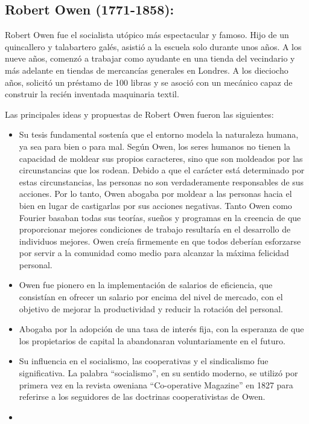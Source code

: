 \documentclass[
  jou,
  floatsintext,
  longtable,
  a4paper,
  nolmodern,
  notxfonts,
  notimes,
  12pt,
  colorlinks=true,linkcolor=blue,citecolor=blue,urlcolor=blue]{apa7}
\providecommand{\tightlist}{%
  \setlength{\itemsep}{0pt}\setlength{\parskip}{0pt}}
\begin{document}
\subsection{Robert Owen (1771-1858):}\label{robert-owen-1771-1858}

Robert Owen fue el socialista utópico más espectacular y famoso. Hijo de
un quincallero y talabartero galés, asistió a la escuela solo durante
unos años. A los nueve años, comenzó a trabajar como ayudante en una
tienda del vecindario y más adelante en tiendas de mercancías generales
en Londres. A los dieciocho años, solicitó un préstamo de 100 libras y
se asoció con un mecánico capaz de construir la recién inventada
maquinaria textil.

Las principales ideas y propuestas de Robert Owen fueron las siguientes:

\begin{itemize}
\tightlist
\item
  Su tesis fundamental sostenía que el entorno modela la naturaleza
  humana, ya sea para bien o para mal. Según Owen, los seres humanos no
  tienen la capacidad de moldear sus propios caracteres, sino que son
  moldeados por las circunstancias que los rodean. Debido a que el
  carácter está determinado por estas circunstancias, las personas no
  son verdaderamente responsables de sus acciones. Por lo tanto, Owen
  abogaba por moldear a las personas hacia el bien en lugar de
  castigarlas por sus acciones negativas. Tanto Owen como Fourier
  basaban todas sus teorías, sueños y programas en la creencia de que
  proporcionar mejores condiciones de trabajo resultaría en el
  desarrollo de individuos mejores. Owen creía firmemente en que todos
  deberían esforzarse por servir a la comunidad como medio para alcanzar
  la máxima felicidad personal.
\item
  Owen fue pionero en la implementación de salarios de eficiencia, que
  consistían en ofrecer un salario por encima del nivel de mercado, con
  el objetivo de mejorar la productividad y reducir la rotación del
  personal.
\item
  Abogaba por la adopción de una tasa de interés fija, con la esperanza
  de que los propietarios de capital la abandonaran voluntariamente en
  el futuro.
\item
  Su influencia en el socialismo, las cooperativas y el sindicalismo fue
  significativa. La palabra ``socialismo'', en su sentido moderno, se
  utilizó por primera vez en la revista oweniana ``Co-operative
  Magazine'' en 1827 para referirse a los seguidores de las doctrinas
  cooperativistas de Owen.
\item
\end{itemize}
\end{document}
